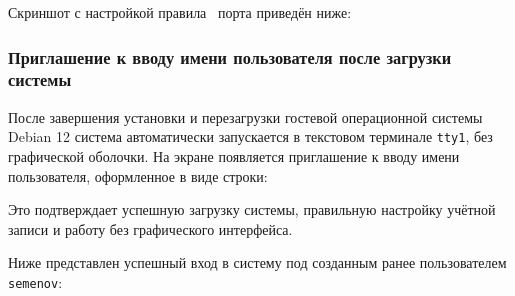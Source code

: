Скриншот с настройкой правила \frqq\ порта приведён ниже:


\subsubsection*{Приглашение к вводу имени пользователя после загрузки системы}

После завершения установки и перезагрузки гостевой операционной системы Debian 12 система автоматически запускается в текстовом терминале \texttt{tty1}, без графической оболочки. На экране появляется приглашение к вводу имени пользователя, оформленное в виде строки:


Это подтверждает успешную загрузку системы, правильную настройку учётной записи и работу без графического интерфейса.

Ниже представлен успешный вход в систему под созданным ранее пользователем \texttt{semenov}:

